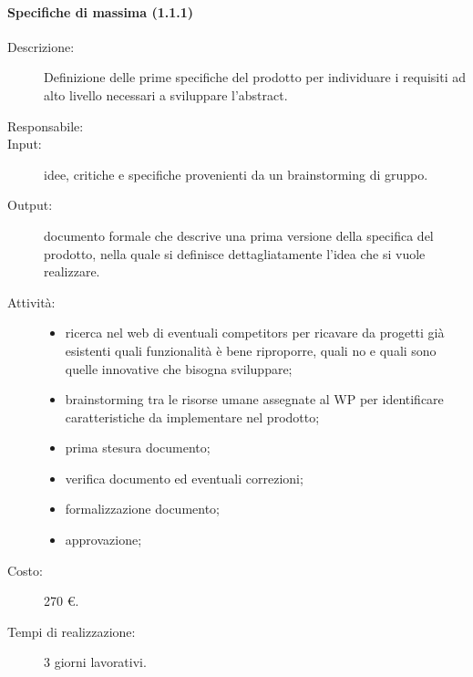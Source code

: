 \paragraph{Specifiche di massima (1.1.1)}
\begin{description}
\item[Descrizione:] Definizione delle prime specifiche del prodotto per individuare i requisiti ad alto livello necessari a sviluppare l'abstract.
\item[Responsabile:]
\item[Input:] idee, critiche e specifiche provenienti da un brainstorming di gruppo.
\item[Output:] documento formale che descrive una prima versione della specifica del prodotto, nella quale si definisce dettagliatamente l'idea che si vuole realizzare.
\item[Attività:]
\begin{center}
\begin{itemize}
\item ricerca nel web di eventuali competitors per ricavare da progetti già esistenti quali funzionalità è bene riproporre, quali no e quali sono quelle innovative che bisogna sviluppare;
\item brainstorming tra le risorse umane assegnate al WP per identificare caratteristiche da implementare nel prodotto;
\item prima stesura documento;
\item verifica documento ed eventuali correzioni;
\item formalizzazione documento;
\item approvazione;
\end{itemize}
\end{center}
\item[Costo:] 270 \euro{}.
\item[Tempi di realizzazione:] 3 giorni lavorativi.
\end{description}


